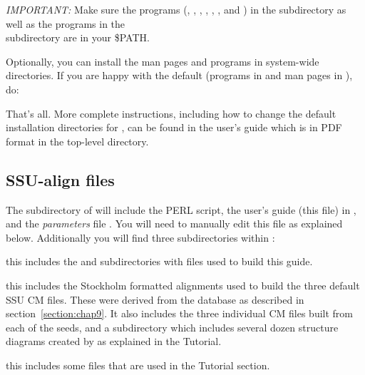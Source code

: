 \emph{IMPORTANT:}
Make sure the  programs (, 
, , , ,
, and ) in the  subdirectory
as well as the  programs in the \\ 
subdirectory are in your \$PATH.

Optionally, you can install the man pages and programs in system-wide
directories. If you are happy with the default (programs in
 and man pages in ),
do:


That's all.  More complete instructions, including how to
change the default installation directories for ,
can be found in the  user's guide which is in 
PDF format in the top-level  directory. 

\subsection{SSU-align files}
The  subdirectory of  will include
the  PERL script, the user's guide (this file) in
, and the \emph{parameters} file 
. You will need to manually edit this file as
explained below. Additionally you will find three subdirectories
within :

\begin{wideitem}

\item[\emprog{documentation}] this includes the  and
   subdirectories with files used to build this
  guide.

\item[\emprog{seeds}] this includes the Stockholm formatted alignments
  used to build the three default SSU CM files. These were derived
  from the  database \cite{CannoneGutell02} as described in
  section~\ref{section:chap9}. It also includes the three individual CM
  files built from each of the seeds, and a subdirectory
   which includes several dozen structure diagrams
  created by  as explained in the Tutorial.

\item[\emprog{tutorial}] this includes some files that are used in the
  Tutorial section.

\end{wideitem}

